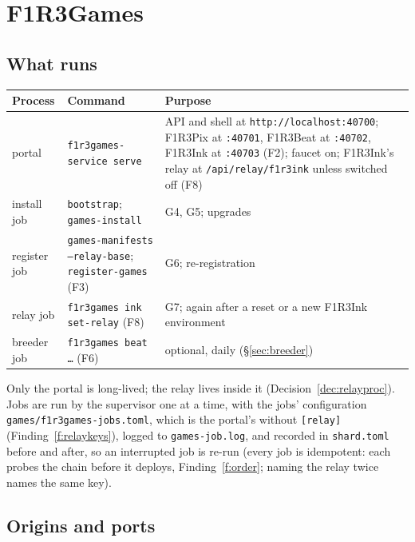 \documentclass[11pt]{article}
\theoremstyle{definition}
\theoremstyle{remark}
\newcommand{\code}[1]{\texttt{#1}}
\newcommand{\Gm}{F1R3Games}
\begin{document}
\section{\Gm{}}\label{sec:games}

\subsection{What runs}

\begin{center}\small
\renewcommand{\arraystretch}{1.15}
\begin{tabularx}{\linewidth}{@{}p{3.0cm}p{3.7cm}X@{}}
\toprule
Process & Command & Purpose\\
\midrule
portal & \code{f1r3games-service serve} & API and shell at \code{http://localhost:40700}; F1R3Pix at \code{:40701}, F1R3Beat at \code{:40702}, F1R3Ink at \code{:40703} (F2); faucet on; F1R3Ink's relay at \code{/api/relay/f1r3ink} unless switched off (F8)\\
install job & \code{bootstrap}; \code{games-install} & G4, G5; upgrades\\
register job & \code{games-manifests --relay-base}; \code{register-games} (F3) & G6; re-registration\\
relay job & \code{f1r3games ink set-relay} (F8) & G7; again after a reset or a new F1R3Ink environment\\
breeder job & \code{f1r3games beat \ldots} (F6) & optional, daily (\S\ref{sec:breeder})\\
\bottomrule
\end{tabularx}
\end{center}

\noindent
Only the portal is long-lived; the relay lives inside it (Decision~\ref{dec:relayproc}).
Jobs are run by the supervisor one at a time, with the jobs' configuration
\code{games/f1r3games-jobs.toml}, which is the portal's without \code{[relay]}
(Finding~\ref{f:relaykeys}), logged to \code{games-job.log}, and recorded in
\code{shard.toml} before and after, so an interrupted job is re-run (every job is
idempotent: each probes the chain before it deploys, Finding~\ref{f:order}; naming the
relay twice names the same key).

\subsection{Origins and ports}\label{sec:gports}
\end{document}
